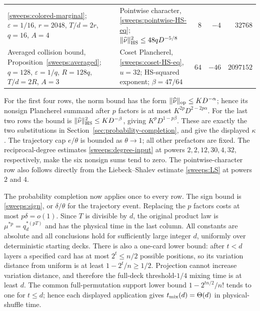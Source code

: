 \begin{longtable}{@{}p{.33\linewidth}p{.29\linewidth}r r r@{}}
\eqref{sweeps:colored-marginal};\newline
$\varepsilon=1/16$, $r=2048$,\newline
$T/d=2r$, $q=16$, $A=4$
&
Pointwise character,\newline
\eqref{sweeps:pointwise-HS-eq};\newline
$\|\widehat\nu\|_{\mathrm{HS}}^2\le48qD^{-5/8}$
& $8$ & $-4$ & $32768$\\
\label{sweeps:assembly-collision-HS}
Averaged collision bound,\newline
Proposition~\ref{sweeps:averaged};\newline
$q=128$, $\varepsilon=1/q$, $R=128q$,\newline
$T/d=2R$, $A=3$
&
Coset Plancherel,\newline
\eqref{sweeps:coset-HS-eq}, $u=32$;\newline
HS-squared exponent;\newline
$\beta=47/64$
& $64$ & $-46$ & $2097152$\\
\end{longtable}
\endgroup

For the first four rows, the norm bound has the form
$\|\widehat\nu\|_{\mathrm{op}}\le K D^{-\alpha}$; hence its nonsign
Plancherel summand after $p$ factors is at most
$K^{2p}D^{2-2p\alpha}$. For the last two rows the bound is
$\|\widehat\nu\|_{\mathrm{HS}}^2\le K D^{-\beta}$, giving
$K^pD^{1-p\beta}$. These are exactly the two substitutions in
Section~\ref{sec:probability-completion}, and give the displayed
$\kappa$. The trajectory cap $e/\theta$ is bounded as $\theta\to1$;
all other prefactors are fixed. The reciprocal-degree estimates
\eqref{sweeps:degree-input} at powers $2,2,12,30,4,32$, respectively,
make the six nonsign sums tend to zero. The pointwise-character row
also follows directly from the Liebeck--Shalev estimate
\eqref{sweeps:LS} at powers $2$ and $4$.

The probability completion now applies once to every row. The sign
bound is \eqref{sweeps:sign}, or $\delta/\theta$ for the trajectory
event. Replacing the $p$ factors costs at most $p\delta=o(1)$.
Since $T$ is divisible by $d$, the original product law is
$\mu^{*p}=q_d^{*(pT)}$ and has the physical time in the last column.
All constants are absolute and all conclusions hold for sufficiently large
integer $d$, uniformly over deterministic starting decks. There is also a
one-card lower bound: after $t<d$ layers a specified card has at most
$2^t\le n/2$ possible positions, so its variation distance from uniform
is at least $1-2^t/n\ge1/2$. Projection cannot increase variation distance, and
therefore the full-deck threshold-$1/4$ mixing time is at least $d$.
The common full-permutation support
lower bound $1-2^{tn/2}/n!$ tends to one for $t\le d$; hence each displayed
application gives $t_{\rm mix}(d)=\Theta(d)$ in physical-shuffle time.
